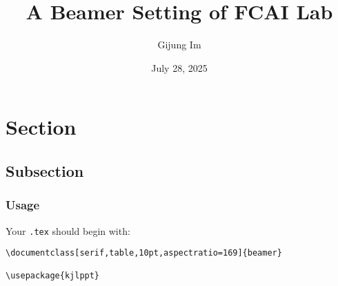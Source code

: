 \documentclass[serif,table,10pt,aspectratio=169]{beamer} %
\title{\large
A Beamer Setting of FCAI Lab
}
\date[August, 2025]{July 28, 2025}
\author{Gijung Im}
\institute{FCAI Lab \\Yonsei University}
\begin{document}
\frame{\titlepage}

\section{Section}

\subsection{Subsection}

\begin{frame}[fragile]
\frametitle{Usage}

Your \texttt{.tex} should begin with:
\begin{lstlisting}
\documentclass[serif,table,10pt,aspectratio=169]{beamer}

\usepackage{kjlppt}
\end{lstlisting}

\end{frame}
\end{document}

